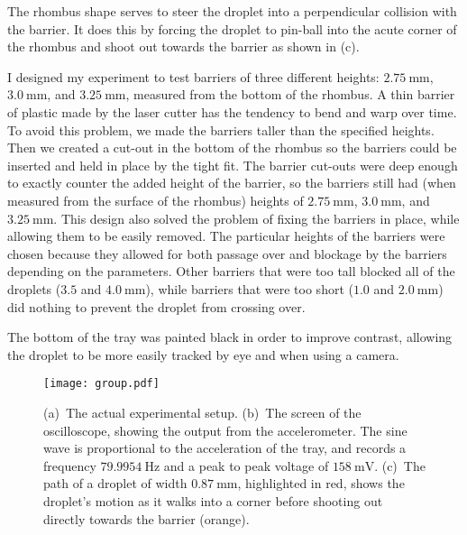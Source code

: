 The rhombus shape serves to steer the droplet into a perpendicular collision with the barrier. It does this by forcing the droplet to pin-ball into the acute corner of the rhombus and shoot out towards the barrier as shown in (c).

I designed my experiment to test barriers of three different heights: $2.75~\mathrm{mm}$, $3.0~\mathrm{mm}$, and $3.25~\mathrm{mm}$, measured from the bottom of the rhombus. A thin barrier of plastic made by the laser cutter has the tendency to bend and warp over time. To avoid this problem, we made the barriers taller than the specified heights. Then we created a cut-out in the bottom of the rhombus so the barriers could be inserted and held in place by the tight fit. The barrier cut-outs were deep enough to exactly counter the added height of the barrier, so the barriers still had (when measured from the surface of the rhombus) heights of $2.75~\mathrm{mm}$, $3.0~\mathrm{mm}$, and $3.25~\mathrm{mm}$. This design also solved the problem of fixing the barriers in place, while allowing them to be easily removed. The particular heights of the barriers were chosen because they allowed for both passage over and blockage by the barriers depending on the parameters. Other barriers that were too tall blocked all of the droplets ($3.5$ and $4.0~\mathrm{mm}$), while barriers that were too short ($1.0$ and $2.0~\mathrm{mm}$) did nothing to prevent the droplet from crossing over.

The bottom of the tray was painted black in order to improve contrast, allowing the droplet to be more easily tracked by eye and when using a camera.

\begin{figure}[h!]
	\centering
	\texttt{[image: group.pdf]}
	\caption{(a)~The actual experimental setup. 
	(b)~The screen of the oscilloscope, showing the output from the accelerometer. The sine wave is proportional to the acceleration of the tray, and records a frequency $79.9954~\mathrm{Hz}$ and a peak to peak voltage of $158~\mathrm{mV}$. 
	(c)~The path of a droplet of width $0.87~\mathrm{mm}$, highlighted in red, shows the droplet's motion as it walks into a corner before shooting out directly towards the barrier (orange).}
	\label{group}
\end{figure}

